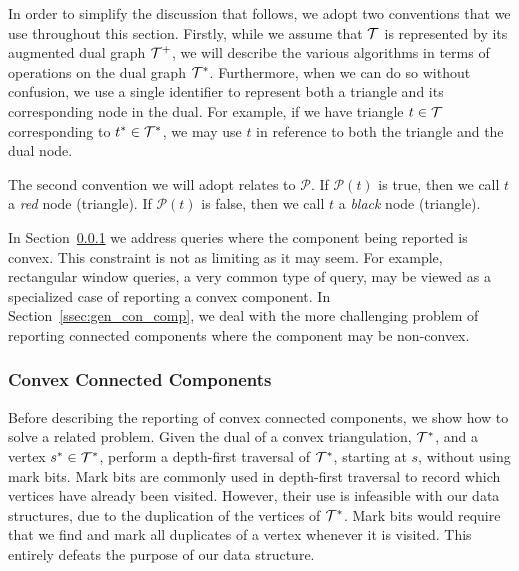 {  In order to simplify the discussion that follows, we adopt two conventions that we use
  throughout this section. 
  Firstly, while we assume that $\mathcal{T}$ is represented by its augmented dual
  graph $\mathcal{T}^+$, we will describe the various algorithms in terms
  of operations on the dual graph $\mathcal{T}^*$. 
  Furthermore, when we can do so without confusion, we use a single identifier
  to represent both a triangle and its corresponding node in the dual.
  For example, if we have triangle $t \in \mathcal{T}$ corresponding to  
  $t^* \in \mathcal{T}^*$, we may use $t$ in reference to both the
  triangle and the dual node.

  The second convention we will adopt relates to $\mathcal{P}$.
  If $\mathcal{P}(t)$ is true, then we call $t$ a \emph{red} node (triangle).  
  If $\mathcal{P}(t)$ is false, then we call $t$ a \emph{black} node (triangle).

  In Section~\ref{ssec:conv_con_comp} we address queries 
  where the component being reported is convex. 
  This constraint is not as limiting as it may seem.
  For example, rectangular window queries, a very common type of query, 
  may be viewed as a specialized case of reporting a convex 
  component.
  In Section~\ref{ssec:gen_con_comp}, we deal with the more challenging 
  problem of reporting
  connected components where the component may be non-convex.

  \subsubsection{Convex Connected Components}\label{ssec:conv_con_comp}

  Before describing the reporting of convex connected components, we show how 
  to solve a related problem. 
  Given the dual of a convex triangulation, $\mathcal{T}^*$, and a 
  vertex $s^* \in \mathcal{T}^*$, 
  perform a depth-first traversal of $\mathcal{T}^*$, starting at $s$, without 
  using mark bits.
  Mark bits are commonly used in depth-first traversal to record which vertices 
  have already been visited. 
  However, their use is infeasible with our data structures, due to the 
  duplication of the vertices of $\mathcal{T}^*$.
  Mark bits would require that we find and mark all duplicates of 
  a vertex whenever it is visited.
  This entirely defeats the purpose of our data structure.

}
